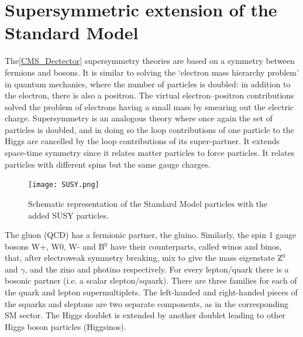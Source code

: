\section{Supersymmetric extension of the Standard Model}

The\ref{CMS_Dectector} supersymmetry theories are based on a symmetry between fermions and bosons. It is similar to solving the `electron mass hierarchy problem' in quantum mechanics, where the number of particles is doubled: in addition to the electron, there is also a positron. The virtual electron--positron contributions solved the problem of electrons having a small mass by smearing out the electric charge. Supersymmetry is an analogous theory where once again the set of particles is doubled, and in doing so the loop contributions of one particle to the Higgs are cancelled by the loop contributions of its super-partner. It extends space-time symmetry since it relates matter particles to force particles. It relates particles with different spins but the same gauge charges.

\begin{figure}[H]
\begin{center}
\texttt{[image: SUSY.png]} 
\caption[Schematic representation of the Standard Model particles with the added SUSY particles.]{Schematic representation of the Standard Model particles with the added SUSY particles.}
\label{SUSY} 
\end{center}
\end{figure}

The gluon (QCD) has a fermionic partner, the gluino. Similarly, the spin 1 gauge bosons W+, W0, W- and B$^0$ have their counterparts, called winos and binos, that, after electroweak symmetry breaking, mix to give the mass eigenstate Z$^0$ and $\gamma$, and the zino and photino respectively. For every lepton/quark there is a bosonic partner (i.e. a scalar slepton/squark). There are three families for each of the quark and lepton supermultiplets. The left-handed and right-handed pieces of the squarks and sleptons are two separate components, as in the corresponding SM sector. The Higgs doublet is extended by another doublet leading to other Higgs boson particles (Higgsinos).\\


